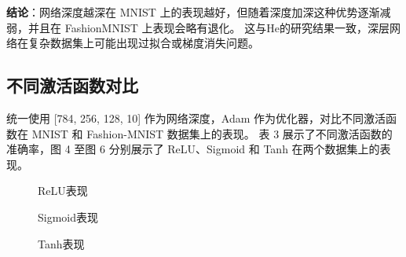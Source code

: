\documentclass[a4paper, twocolumn]{article}
\begin{document}
\textbf{结论}：网络深度越深在 MNIST 上的表现越好，但随着深度加深这种优势逐渐减弱，并且在 FashionMNIST 上表现会略有退化。
              这与He的研究结果\cite{he2016deep}一致，深层网络在复杂数据集上可能出现过拟合或梯度消失问题。


\subsection{不同激活函数对比}
统一使用 [784, 256, 128, 10] 作为网络深度，Adam 作为优化器，对比不同激活函数在 MNIST 和 Fashion-MNIST 数据集上的表现。
表 3 展示了不同激活函数的准确率，图 4 至图 6 分别展示了 ReLU、Sigmoid 和 Tanh 在两个数据集上的表现。
\begin{table}[H]
    \centering
    \caption{激活函数性能对比}
    \label{tab:activation}
\end{table}

\begin{figure}[H]
    \centering
    \caption{ReLU表现}
    \label{fig:21}
\end{figure}

\begin{figure}[H]
    \centering
    \caption{Sigmoid表现}
    \label{fig:22}
\end{figure}

\begin{figure}[H]
    \centering
    \caption{Tanh表现}
    \label{fig:23}
\end{figure}
\end{document}
